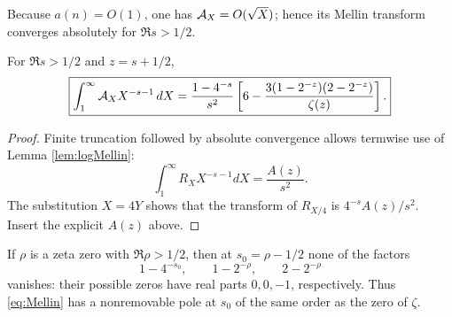 Because $a(n)=O(1)$, one has $\mathcal A_X=O(\sqrt X)$; hence its Mellin transform
converges absolutely for $\Re s>1/2$.

\begin{theorem}\label{thm:Mellin}
For $\Re s>1/2$ and $z=s+1/2$,
\begin{equation}\label{eq:Mellin}
 \boxed{
 \int_1^\infty\mathcal A_X X^{-s-1}\,dX
 =\frac{1-4^{-s}}{s^2}
  \left[6-\frac{3(1-2^{-z})(2-2^{-z})}{\zeta(z)}\right].}
\end{equation}
\end{theorem}
\begin{proof}
Finite truncation followed by absolute convergence allows termwise use of
Lemma \ref{lem:logMellin}:
\[
 \int_1^\infty R_X X^{-s-1}dX=\frac{A(z)}{s^2}.
\]
The substitution $X=4Y$ shows that the transform of $R_{X/4}$ is
$4^{-s}A(z)/s^2$.  Insert the explicit $A(z)$ above.
\end{proof}

If $\rho$ is a zeta zero with $\Re\rho>1/2$, then at
$s_0=\rho-1/2$ none of the factors
\[
1-4^{-s_0},\qquad1-2^{-\rho},\qquad2-2^{-\rho}
\]
vanishes: their possible zeros have real parts $0,0,-1$, respectively.
Thus \eqref{eq:Mellin} has a nonremovable pole at $s_0$ of the same order as
the zero of $\zeta$.

